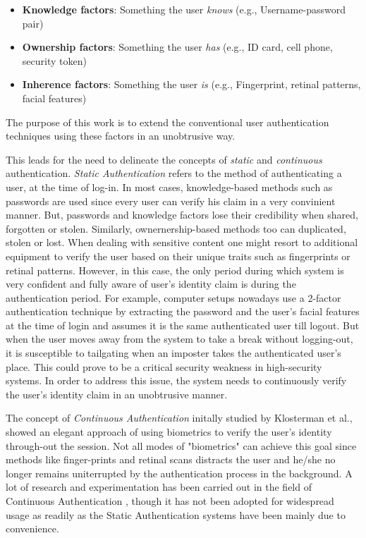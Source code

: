 \documentclass[%
        final,
        internal,
        notitlepage,
        narroweqnarray,
        inline,
        ]{ieee}
\begin{document}
\begin{itemize}
	\item \textbf{Knowledge factors}: Something the user \emph{knows} (e.g., Username-password pair)
	\item \textbf{Ownership factors}: Something the user \emph{has} (e.g., ID card, cell phone, security token)
	\item \textbf{Inherence factors}: Something the user \emph{is} (e.g., Fingerprint, retinal patterns, facial features)
\end{itemize}

The purpose of this work is to extend the conventional user authentication techniques using these factors in an unobtrusive way.

This leads for the need to delineate the concepts of \emph{static} and \emph{continuous} authentication.
\emph{Static Authentication} refers to the method of authenticating a user, at the time of log-in.
In most cases, knowledge-based methods such as passwords are used since every user can verify his claim in a very convinient manner.
But, passwords and knowledge factors lose their credibility when shared, forgotten or stolen.
Similarly, ownernership-based methods too can duplicated, stolen or lost.
When dealing with sensitive content one might resort to additional equipment to verify the user based on their unique traits such as fingerprints or retinal patterns.
However, in this case, the only period during which system is very confident and fully aware of user's identity claim is during the authentication period.
For example, computer setups nowadays use a 2-factor authentication technique by extracting the password and the user's facial features at the time of login and assumes it is the same authenticated user till logout.
But when the user moves away from the system to take a break without logging-out, it is susceptible to tailgating when an imposter takes the authenticated user's place.
This could prove to be a critical security weakness in  high-security systems.
In order to address this issue, the system needs to continuously verify the user's identity claim in an unobtrusive manner.

The concept of \emph{Continuous Authentication} initally studied by Klosterman et al.\cite{Klos00}, showed an elegant approach of using biometrics to verify the user's identity through-out the session.
Not all modes of "biometrics" can achieve this goal since methods like finger-prints and retinal scans distracts the user and he/she no longer remains uniterrupted by the authentication process in the background.
A lot of research and experimentation has been carried out in the field of Continuous Authentication \cite{Niin10,Klos00,mon00,turk03,sim07,azz08,azz082}, though it has not been adopted for widespread usage as readily as the Static Authentication systems have been mainly due to convenience.
\end{document}
